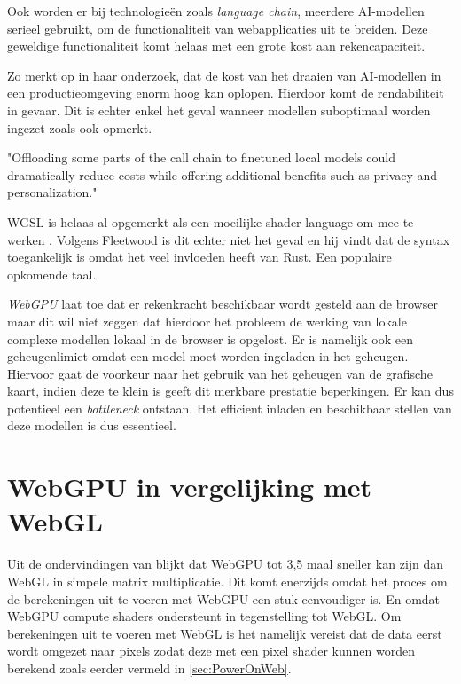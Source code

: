 \bigbreak{}

Ook worden er bij technologieën zoals \textit{language chain}, meerdere AI-mo\-de\-llen serieel gebruikt, om de functionaliteit van webapplicaties uit te breiden. Deze geweldige functionaliteit komt helaas met een grote kost aan rekencapaciteit.

\bigbreak{}

Zo merkt \textcite{Huyen2023} op in haar onderzoek, dat de kost van het draaien van AI-modellen in een productieomgeving enorm hoog kan oplopen. Hierdoor komt de rendabiliteit in gevaar. Dit is echter enkel het geval wanneer modellen suboptimaal worden ingezet zoals \textcite{Fleetwood2023a} ook opmerkt.

\begin{displayquote}
    "Offloading some parts of the call chain to finetuned local models could dramatically reduce costs while offering additional benefits such as privacy and personalization."
\end{displayquote}

\bigbreak{}

WGSL is helaas al opgemerkt als een moeilijke shader language om mee te werken \textcite{Madrigal2023}. Volgens Fleetwood is dit echter niet het geval en hij vindt dat de syntax toegankelijk is omdat het veel invloeden heeft van Rust. Een populaire opkomende taal.

\bigbreak{}

\textit{WebGPU} laat toe dat er rekenkracht beschikbaar wordt gesteld aan de browser maar dit wil niet zeggen dat hierdoor het probleem de werking van lokale complexe modellen lokaal in de browser is opgelost. Er is namelijk ook een geheugenlimiet omdat een model moet worden ingeladen in het geheugen. Hiervoor gaat de voorkeur naar het gebruik van het geheugen van de grafische kaart, indien deze te klein is geeft dit merkbare prestatie beperkingen. Er kan dus potentieel een \textit{bottleneck} ontstaan. Het efficient inladen en beschikbaar stellen van deze modellen is dus essentieel.

\break{}

\section{WebGPU in vergelijking met WebGL}

Uit de ondervindingen van \textcite{Radin2021} blijkt dat WebGPU tot 3,5 maal sneller kan zijn dan WebGL in simpele matrix multiplicatie. Dit komt enerzijds omdat het proces om de berekeningen uit te voeren met WebGPU een stuk eenvoudiger is. En omdat WebGPU compute shaders ondersteunt in tegenstelling tot WebGL. Om berekeningen uit te voeren met WebGL is het namelijk vereist dat de data eerst wordt omgezet naar pixels zodat deze met een pixel shader kunnen worden berekend zoals eerder vermeld in \ref{sec:PowerOnWeb}. 

